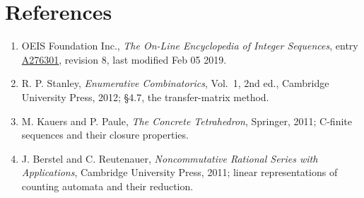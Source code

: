 \documentclass[11pt]{article}
\theoremstyle{definition}
\begin{document}
\section{References}

\begin{enumerate}

\item OEIS Foundation Inc., \emph{The On-Line Encyclopedia of Integer Sequences}, entry \href{https://oeis.org/A276301}{A276301}, revision 8, last modified Feb 05 2019.

\item R. P. Stanley, \emph{Enumerative Combinatorics}, Vol.~1, 2nd ed., Cambridge University Press, 2012; \S4.7, the transfer-matrix method.

\item M. Kauers and P. Paule, \emph{The Concrete Tetrahedron}, Springer, 2011; C-finite sequences and their closure properties.

\item J. Berstel and C. Reutenauer, \emph{Noncommutative Rational Series with Applications}, Cambridge University Press, 2011; linear representations of counting automata and their reduction.

\end{enumerate}
\end{document}
